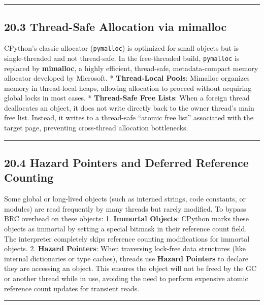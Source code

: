 \begin{center}\rule{0.5\linewidth}{0.5pt}\end{center}

\hypertarget{thread-safe-allocation-via-mimalloc}{%
\subsection{20.3 Thread-Safe Allocation via
mimalloc}\label{thread-safe-allocation-via-mimalloc}}

CPython's classic allocator (\passthrough{\lstinline!pymalloc!}) is
optimized for small objects but is single-threaded and not thread-safe.
In the free-threaded build, \passthrough{\lstinline!pymalloc!} is
replaced by \textbf{mimalloc}, a highly efficient, thread-safe,
metadata-compact memory allocator developed by Microsoft. *
\textbf{Thread-Local Pools}: Mimalloc organizes memory in thread-local
heaps, allowing allocation to proceed without acquiring global locks in
most cases. * \textbf{Thread-Safe Free Lists}: When a foreign thread
deallocates an object, it does not write directly back to the owner
thread's main free list. Instead, it writes to a thread-safe ``atomic
free list'' associated with the target page, preventing cross-thread
allocation bottlenecks.

\begin{center}\rule{0.5\linewidth}{0.5pt}\end{center}

\hypertarget{hazard-pointers-and-deferred-reference-counting}{%
\subsection{20.4 Hazard Pointers and Deferred Reference
Counting}\label{hazard-pointers-and-deferred-reference-counting}}

Some global or long-lived objects (such as interned strings, code
constants, or modules) are read frequently by many threads but rarely
modified. To bypass BRC overhead on these objects: 1. \textbf{Immortal
Objects}: CPython marks these objects as immortal by setting a special
bitmask in their reference count field. The interpreter completely skips
reference counting modifications for immortal objects. 2. \textbf{Hazard
Pointers}: When traversing lock-free data structures (like internal
dictionaries or type caches), threads use \textbf{Hazard Pointers} to
declare they are accessing an object. This ensures the object will not
be freed by the GC or another thread while in use, avoiding the need to
perform expensive atomic reference count updates for transient reads.

\begin{center}\rule{0.5\linewidth}{0.5pt}\end{center}
